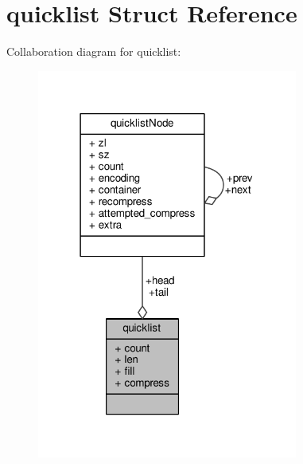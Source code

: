 \hypertarget{structquicklist}{}\section{quicklist Struct Reference}
\label{structquicklist}


Collaboration diagram for quicklist\+:\nopagebreak
\begin{figure}[H]
\begin{center}
\leavevmode
\includegraphics[width=243pt]{structquicklist__coll__graph}
\end{center}
\end{figure}
